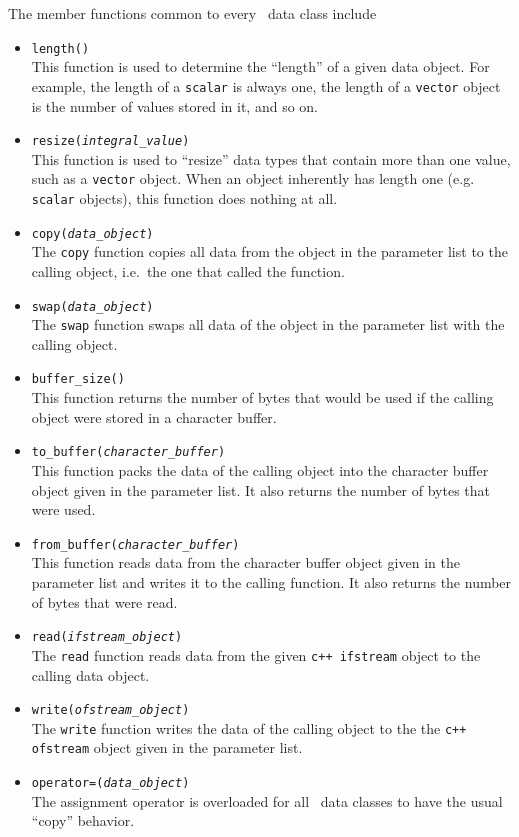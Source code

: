 The member functions common to every \MMSP\ data class include
\begin{itemize}
\item {\tt length()} \\
This function is used to determine the ``length'' of a given data object.  For example, the length of a {\tt scalar} is always one, the length of a {\tt vector} object is the number of values stored in it, and so on.

\item {\tt resize({\it integral\_value})} \\
This function is used to ``resize'' data types that contain more than one value, such as a {\tt vector} object.  When an object inherently has length one (e.g. {\tt scalar} objects), this function does nothing at all.

\item {\tt copy({\it data\_object})} \\
The {\tt copy} function copies all data from the object in the parameter list to the calling object, i.e.\ the one that called the function.

\item {\tt swap({\it data\_object})} \\
The {\tt swap} function swaps all data of the object in the parameter list with the calling object.

\item {\tt buffer\_size()} \\
This function returns the number of bytes that would be used if the calling object were stored in a character buffer.

\item {\tt to\_buffer({\it character\_buffer})} \\
This function packs the data of the calling object into the character buffer object given in the parameter list.  It also returns the number of bytes that were used.

\item {\tt from\_buffer({\it character\_buffer})} \\
This function reads data from the character buffer object given in the parameter list and writes it to the calling function.  It also returns the number of bytes that were read.

\item {\tt read({\it ifstream\_object})} \\
The {\tt read} function reads data from the given {\tt c++ ifstream} object to the calling data object.

\item {\tt write({\it ofstream\_object})} \\
The {\tt write} function writes the data of the calling object to the the {\tt c++ ofstream} object given in the parameter list.

\item {\tt operator=({\it data\_object})} \\
The assignment operator is overloaded for all \MMSP\ data classes to have the usual ``copy'' behavior.
\end{itemize}
